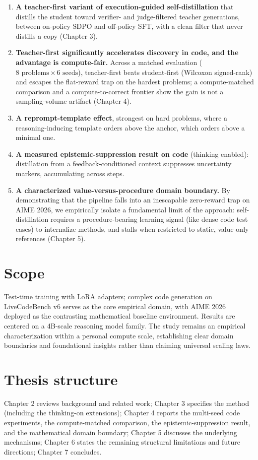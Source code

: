 \begin{enumerate}
\def\labelenumi{\arabic{enumi}.}
\tightlist
\item
  \textbf{A teacher-first variant of execution-guided self-distillation} that distills the student toward verifier- and judge-filtered teacher generations, between on-policy SDPO and off-policy SFT, with a clean filter that never distills a copy (Chapter 3).
\item
  \textbf{Teacher-first significantly accelerates discovery in code, and the advantage is compute-fair.} Across a matched evaluation ($8\text{ problems} \times 6\text{ seeds}$), teacher-first beats student-first (Wilcoxon signed-rank) and escapes the flat-reward trap on the hardest problems; a compute-matched comparison and a compute-to-correct frontier show the gain is not a sampling-volume artifact (Chapter 4).
\item
  \textbf{A reprompt-template effect}, strongest on hard problems, where a reasoning-inducing template orders above the anchor, which orders above a minimal one.
\item
  \textbf{A measured epistemic-suppression result on code} (thinking enabled): distillation from a feedback-conditioned context suppresses uncertainty markers, accumulating across steps.
\item
  \textbf{A characterized value-versus-procedure domain boundary.} By demonstrating that the pipeline falls into an inescapable zero-reward trap on AIME 2026, we empirically isolate a fundamental limit of the approach: self-distillation requires a procedure-bearing learning signal (like dense code test cases) to internalize methods, and stalls when restricted to static, value-only references (Chapter 5).
\end{enumerate}

\section{Scope}\label{scope}

Test-time training with LoRA adapters; complex code generation on LiveCodeBench v6 \cite{r6} serves as the core empirical domain, with AIME 2026 deployed as the contrasting mathematical baseline environment. Results are centered on a 4B-scale reasoning model family. The study remains an empirical characterization within a personal compute scale, establishing clear domain boundaries and foundational insights rather than claiming universal scaling laws.

\section{Thesis structure}\label{thesis-structure}

Chapter 2 reviews background and related work; Chapter 3 specifies the method (including the thinking-on extensions); Chapter 4 reports the multi-seed code experiments, the compute-matched comparison, the epistemic-suppression result, and the mathematical domain boundary; Chapter 5 discusses the underlying mechanisms; Chapter 6 states the remaining structural limitations and future directions; Chapter 7 concludes.